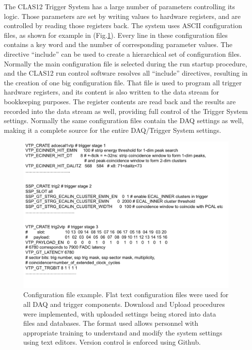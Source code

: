 The CLAS12 Trigger System has a large number of parameters controlling its logic. Those parameters are set by writing values to hardware registers, and are controlled by reading those registers back. The system uses ASCII configuration files, as shown for example in (Fig.\ref{fig:config}). Every line in these configuration files contains a key word and the number of corresponding parameter values. The directive ``include'' can be used to create a hierarchical set of configuration files. Normally the main configuration file is selected during the run startup procedure, and the CLAS12 run control software resolves all ``include'' directives, resulting in the creation of one big configuration file. That file is used to program all trigger hardware registers, and its content is also written to the data stream for bookkeeping purposes. The register contents are read back and the results are recorded into the data stream as well, providing full control of the Trigger System settings. Normally the same configuration files contain the DAQ settings as well, making it a complete source for the entire DAQ/Trigger System settings.

\begin{figure}[hbt]
	\centering
	\includegraphics[width=1.0\columnwidth,keepaspectratio]{img/config.png}
	\caption{Configuration file example. Flat text configuration files were used for all DAQ and trigger components. Download and Upload procedures were implemented, with uploaded settings being stored into data files and databases. The format used allows personnel with appropriate training to understand and modify the system settings using text editors. Version control is enforced using Github.}
	\label{fig:config}
\end{figure}


